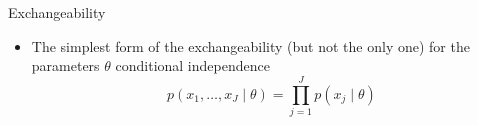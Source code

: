 \documentclass[finnish,english,t]{beamer}
\begin{document}
\begin{frame}{Exchangeability}

  \begin{itemize}
  \item The simplest form of the exchangeability (but not the only
    one) for the parameters $\theta$ conditional independence
    \begin{equation*}
      p(x_1,\ldots,x_J \mid \theta)=\prod_{j=1}^J p(x_j \mid \theta)
    \end{equation*}

   \end{itemize}
\end{frame}
\end{document}

